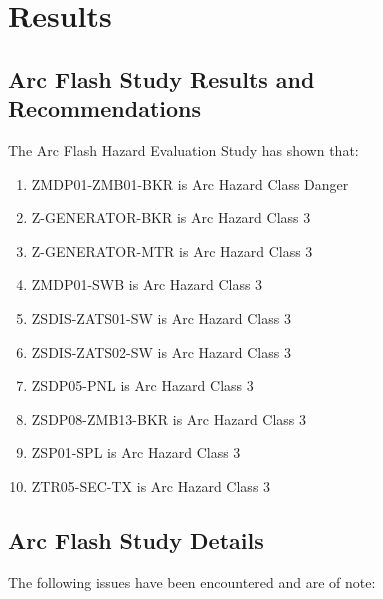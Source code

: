 
\section{Results}
\label{af:results}

\subsection{Arc Flash Study Results and Recommendations}
\label{af:results:afrr}

The Arc Flash Hazard Evaluation Study has shown that:
\begin{enumerate}
\item ZMDP01-ZMB01-BKR is Arc Hazard Class Danger
\item Z-GENERATOR-BKR is Arc Hazard Class 3
\item Z-GENERATOR-MTR is Arc Hazard Class 3
\item ZMDP01-SWB is Arc Hazard Class 3
\item ZSDIS-ZATS01-SW is Arc Hazard Class 3
\item ZSDIS-ZATS02-SW is Arc Hazard Class 3
\item ZSDP05-PNL is Arc Hazard Class 3
\item ZSDP08-ZMB13-BKR is Arc Hazard Class 3
\item ZSP01-SPL is Arc Hazard Class 3
\item ZTR05-SEC-TX is Arc Hazard Class 3
\end{enumerate}

\pagebreak

\subsection{Arc Flash Study Details}
\label{af:results:afsd}

The following issues have been encountered and are of note:

